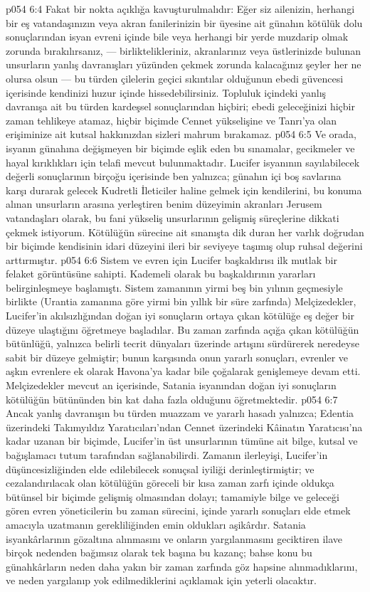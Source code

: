 \vs p054 6:4 Fakat bir nokta açıklığa kavuşturulmalıdır: Eğer siz ailenizin, herhangi bir eş vatandaşınızın veya akran fanilerinizin bir üyesine ait günahın kötülük dolu sonuçlarından isyan evreni içinde bile veya herhangi bir yerde muzdarip olmak zorunda bırakılırsanız, --- birliktelikleriniz, akranlarınız veya üstlerinizde bulunan unsurların yanlış davranışları yüzünden çekmek zorunda kalacağınız şeyler her ne olursa olsun --- bu türden çilelerin geçici sıkıntılar olduğunun ebedi güvencesi içerisinde kendinizi huzur içinde hissedebilirsiniz. Topluluk içindeki yanlış davranışa ait bu türden kardeşsel sonuçlarından hiçbiri; ebedi geleceğinizi hiçbir zaman tehlikeye atamaz, hiçbir biçimde Cennet yükselişine ve Tanrı’ya olan erişiminize ait kutsal hakkınızdan sizleri mahrum bırakamaz.
\vs p054 6:5 Ve orada, isyanın günahına değişmeyen bir biçimde eşlik eden bu sınamalar, gecikmeler ve hayal kırıklıkları için telafi mevcut bulunmaktadır. Lucifer isyanının sayılabilecek değerli sonuçlarının birçoğu içerisinde ben yalnızca; günahın içi boş savlarına karşı durarak gelecek Kudretli İleticiler haline gelmek için kendilerini, bu konuma alınan unsurların arasına yerleştiren benim düzeyimin akranları Jerusem vatandaşları olarak, bu fani yükseliş unsurlarının gelişmiş süreçlerine dikkati çekmek istiyorum. Kötülüğün sürecine ait sınanışta dik duran her varlık doğrudan bir biçimde kendisinin idari düzeyini ileri bir seviyeye taşımış olup ruhsal değerini arttırmıştır.
\vs p054 6:6 Sistem ve evren için Lucifer başkaldırısı ilk mutlak bir felaket görüntüsüne sahipti. Kademeli olarak bu başkaldırının yararları belirginleşmeye başlamıştı. Sistem zamanının yirmi beş bin yılının geçmesiyle birlikte (Urantia zamanına göre yirmi bin yıllık bir süre zarfında) Melçizedekler, Lucifer’in akılsızlığından doğan iyi sonuçların ortaya çıkan kötülüğe eş değer bir düzeye ulaştığını öğretmeye başladılar. Bu zaman zarfında açığa çıkan kötülüğün bütünlüğü, yalnızca belirli tecrit dünyaları üzerinde artışını sürdürerek neredeyse sabit bir düzeye gelmiştir; bunun karşısında onun yararlı sonuçları, evrenler ve aşkın evrenlere ek olarak Havona’ya kadar bile çoğalarak genişlemeye devam etti. Melçizedekler mevcut an içerisinde, Satania isyanından doğan iyi sonuçların kötülüğün bütününden bin kat daha fazla olduğunu öğretmektedir.
\vs p054 6:7 Ancak yanlış davranışın bu türden muazzam ve yararlı hasadı yalnızca; Edentia üzerindeki Takımyıldız Yaratıcıları’ndan Cennet üzerindeki Kâinatın Yaratıcısı’na kadar uzanan bir biçimde, Lucifer’in üst unsurlarının tümüne ait bilge, kutsal ve bağışlamacı tutum tarafından sağlanabilirdi. Zamanın ilerleyişi, Lucifer’in düşüncesizliğinden elde edilebilecek sonuçsal iyiliği derinleştirmiştir; ve cezalandırılacak olan kötülüğün göreceli bir kısa zaman zarfı içinde oldukça bütünsel bir biçimde gelişmiş olmasından dolayı; tamamiyle bilge ve geleceği gören evren yöneticilerin bu zaman sürecini, içinde yararlı sonuçları elde etmek amacıyla uzatmanın gerekliliğinden emin oldukları aşikârdır. Satania isyankârlarının gözaltına alınmasını ve onların yargılanmasını geciktiren ilave birçok nedenden bağımsız olarak tek başına bu kazanç; bahse konu bu günahkârların neden daha yakın bir zaman zarfında göz hapsine alınmadıklarını, ve neden yargılanıp yok edilmediklerini açıklamak için yeterli olacaktır.
